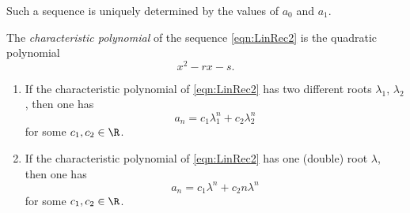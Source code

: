 \begin{page}
\setcounter{section}{1}
\setcounter{subsection}{2}
\setcounter{dfn}{2}
\label{portion:790}

Such a sequence is uniquely determined by the values of $a_0$ and $a_1$.


\end{page}

\begin{page}
\setcounter{section}{1}
\setcounter{subsection}{2}
\setcounter{dfn}{3}
\label{portion:792}

\begin{dfn}
The \emph{characteristic polynomial} of the sequence \eqref{eqn:LinRec2} is the quadratic polynomial
\[
x^2 - rx - s.
\]
\end{dfn}

\end{page}

\begin{page}
\setcounter{section}{1}
\setcounter{subsection}{2}
\setcounter{dfn}{4}
\label{portion:795}

\begin{thm}
\begin{enumerate}
\item
If the characteristic polynomial of \eqref{eqn:LinRec2} has two different roots $\lambda_1$, $\lambda_2$,
then one has
\[
a_n = c_1 \lambda_1^n + c_2 \lambda_2^n
\]
for some $c_1, c_2 \in \R$.
\item
If the characteristic polynomial of \eqref{eqn:LinRec2} has one (double) root $\lambda$,
then one has
\[
a_n = c_1 \lambda^n + c_2 n \lambda^n
\]
for some $c_1, c_2 \in \R$.
\end{enumerate}
\end{thm}

\end{page}

